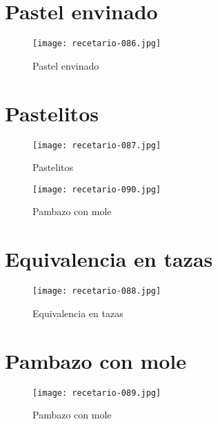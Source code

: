 \documentclass[12pt,letterpaper]{article}
\begin{document}
\newpage

\section{Pastel envinado}
  \begin{figure}[H]
    \vspace{2pt}
  \texttt{[image: recetario-086.jpg]}
    \caption{Pastel envinado}
    
  \end{figure}
  
\newpage

\section{Pastelitos}
  \begin{figure}[H]
    \vspace{2pt}
  \texttt{[image: recetario-087.jpg]}
    \caption{Pastelitos}
    
  \end{figure}

  \newpage

  \begin{figure}[H]
    \vspace{2pt}
  \texttt{[image: recetario-090.jpg]}
    \caption{Pambazo con mole}
    
  \end{figure}

\newpage

\section{Equivalencia en tazas}
  \begin{figure}[H]
    \vspace{2pt}
  \texttt{[image: recetario-088.jpg]}
    \caption{Equivalencia en tazas}
    
  \end{figure}

\newpage

\section{Pambazo con mole}
  \begin{figure}[H]
    \vspace{2pt}
  \texttt{[image: recetario-089.jpg]}
    \caption{Pambazo con mole}
    
  \end{figure}
\end{document}
